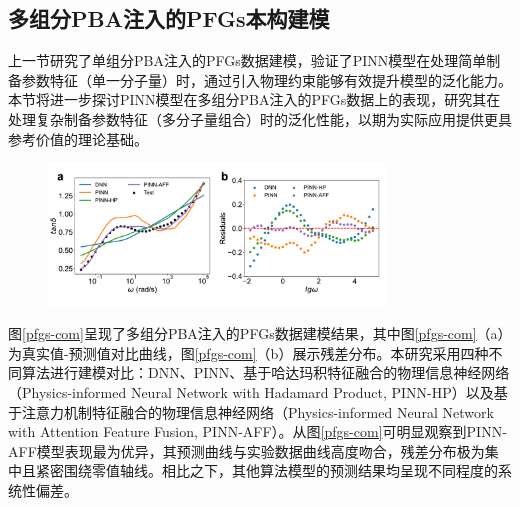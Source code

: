 \subsection{多组分PBA注入的PFGs本构建模}
上一节研究了单组分PBA注入的PFGs数据建模，验证了PINN模型在处理简单制备参数特征（单一分子量）时，通过引入物理约束能够有效提升模型的泛化能力。本节将进一步探讨PINN模型在多组分PBA注入的PFGs数据上的表现，研究其在处理复杂制备参数特征（多分子量组合）时的泛化性能，以期为实际应用提供更具参考价值的理论基础。
\begin{figure}[htbp]
  \centering
  \includegraphics[width=0.8\textwidth]{Fig/pfgs-com.pdf}
\end{figure}
图\ref{pfgs-com}呈现了多组分PBA注入的PFGs数据建模结果，其中图\ref{pfgs-com}（a）为真实值-预测值对比曲线，图\ref{pfgs-com}（b）展示残差分布。本研究采用四种不同算法进行建模对比：DNN、PINN、基于哈达玛积特征融合的物理信息神经网络（Physics-informed Neural Network with Hadamard Product, PINN-HP）以及基于注意力机制特征融合的物理信息神经网络（Physics-informed Neural Network with Attention Feature Fusion, PINN-AFF）。从图\ref{pfgs-com}可明显观察到PINN-AFF模型表现最为优异，其预测曲线与实验数据曲线高度吻合，残差分布极为集中且紧密围绕零值轴线。相比之下，其他算法模型的预测结果均呈现不同程度的系统性偏差。

